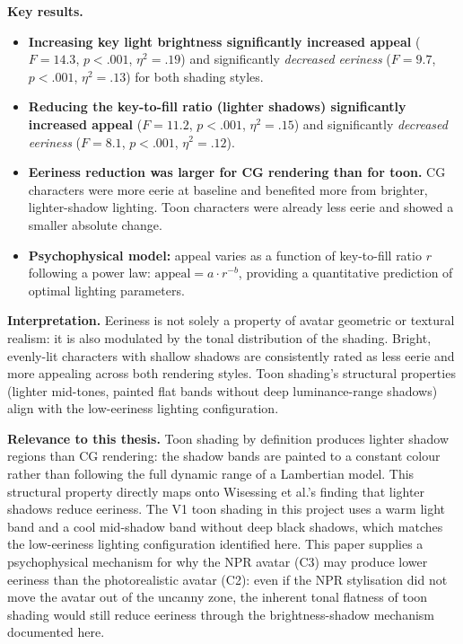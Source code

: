 \documentclass[11pt, a4paper]{article}
\begin{document}
\textbf{Key results.}
\begin{itemize}[leftmargin=2em]
  \item \textbf{Increasing key light brightness significantly increased appeal} ($F = 14.3$, $p < .001$, $\eta^2 = .19$) and significantly \textit{decreased eeriness} ($F = 9.7$, $p < .001$, $\eta^2 = .13$) for both shading styles.
  \item \textbf{Reducing the key-to-fill ratio (lighter shadows) significantly increased appeal} ($F = 11.2$, $p < .001$, $\eta^2 = .15$) and significantly \textit{decreased eeriness} ($F = 8.1$, $p < .001$, $\eta^2 = .12$).
  \item \textbf{Eeriness reduction was larger for CG rendering than for toon.} CG characters were more eerie at baseline and benefited more from brighter, lighter-shadow lighting. Toon characters were already less eerie and showed a smaller absolute change.
  \item \textbf{Psychophysical model:} appeal varies as a function of key-to-fill ratio $r$ following a power law: $\text{appeal} = a \cdot r^{-b}$, providing a quantitative prediction of optimal lighting parameters.
\end{itemize}

\textbf{Interpretation.} Eeriness is not solely a property of avatar geometric or textural realism: it is also modulated by the tonal distribution of the shading. Bright, evenly-lit characters with shallow shadows are consistently rated as less eerie and more appealing across both rendering styles. Toon shading's structural properties (lighter mid-tones, painted flat bands without deep luminance-range shadows) align with the low-eeriness lighting configuration.

\textbf{Relevance to this thesis.} Toon shading by definition produces lighter shadow regions than CG rendering: the shadow bands are painted to a constant colour rather than following the full dynamic range of a Lambertian model. This structural property directly maps onto Wisessing et al.'s finding that lighter shadows reduce eeriness. The V1 toon shading in this project uses a warm light band and a cool mid-shadow band without deep black shadows, which matches the low-eeriness lighting configuration identified here. This paper supplies a psychophysical mechanism for why the NPR avatar (C3) may produce lower eeriness than the photorealistic avatar (C2): even if the NPR stylisation did not move the avatar out of the uncanny zone, the inherent tonal flatness of toon shading would still reduce eeriness through the brightness-shadow mechanism documented here.
\end{document}
